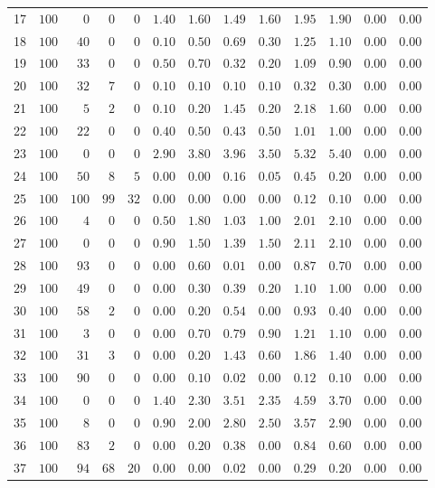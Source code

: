 \documentclass{article}
\begin{document}
\begin{landscape}
\begin{longtable}{lrrrrrrrrrrrr}
17&$100$&$  0$&$  0$&$  0$&$1.40$&$1.60$&$1.49$&$1.60$&$1.95$&$1.90$&$0.00$&$0.00$\\
18&$100$&$ 40$&$  0$&$  0$&$0.10$&$0.50$&$0.69$&$0.30$&$1.25$&$1.10$&$0.00$&$0.00$\\
19&$100$&$ 33$&$  0$&$  0$&$0.50$&$0.70$&$0.32$&$0.20$&$1.09$&$0.90$&$0.00$&$0.00$\\
20&$100$&$ 32$&$  7$&$  0$&$0.10$&$0.10$&$0.10$&$0.10$&$0.32$&$0.30$&$0.00$&$0.00$\\
21&$100$&$  5$&$  2$&$  0$&$0.10$&$0.20$&$1.45$&$0.20$&$2.18$&$1.60$&$0.00$&$0.00$\\
22&$100$&$ 22$&$  0$&$  0$&$0.40$&$0.50$&$0.43$&$0.50$&$1.01$&$1.00$&$0.00$&$0.00$\\
23&$100$&$  0$&$  0$&$  0$&$2.90$&$3.80$&$3.96$&$3.50$&$5.32$&$5.40$&$0.00$&$0.00$\\
24&$100$&$ 50$&$  8$&$  5$&$0.00$&$0.00$&$0.16$&$0.05$&$0.45$&$0.20$&$0.00$&$0.00$\\
25&$100$&$100$&$ 99$&$ 32$&$0.00$&$0.00$&$0.00$&$0.00$&$0.12$&$0.10$&$0.00$&$0.00$\\
26&$100$&$  4$&$  0$&$  0$&$0.50$&$1.80$&$1.03$&$1.00$&$2.01$&$2.10$&$0.00$&$0.00$\\
27&$100$&$  0$&$  0$&$  0$&$0.90$&$1.50$&$1.39$&$1.50$&$2.11$&$2.10$&$0.00$&$0.00$\\
28&$100$&$ 93$&$  0$&$  0$&$0.00$&$0.60$&$0.01$&$0.00$&$0.87$&$0.70$&$0.00$&$0.00$\\
29&$100$&$ 49$&$  0$&$  0$&$0.00$&$0.30$&$0.39$&$0.20$&$1.10$&$1.00$&$0.00$&$0.00$\\
30&$100$&$ 58$&$  2$&$  0$&$0.00$&$0.20$&$0.54$&$0.00$&$0.93$&$0.40$&$0.00$&$0.00$\\
31&$100$&$  3$&$  0$&$  0$&$0.00$&$0.70$&$0.79$&$0.90$&$1.21$&$1.10$&$0.00$&$0.00$\\
32&$100$&$ 31$&$  3$&$  0$&$0.00$&$0.20$&$1.43$&$0.60$&$1.86$&$1.40$&$0.00$&$0.00$\\
33&$100$&$ 90$&$  0$&$  0$&$0.00$&$0.10$&$0.02$&$0.00$&$0.12$&$0.10$&$0.00$&$0.00$\\
34&$100$&$  0$&$  0$&$  0$&$1.40$&$2.30$&$3.51$&$2.35$&$4.59$&$3.70$&$0.00$&$0.00$\\
35&$100$&$  8$&$  0$&$  0$&$0.90$&$2.00$&$2.80$&$2.50$&$3.57$&$2.90$&$0.00$&$0.00$\\
36&$100$&$ 83$&$  2$&$  0$&$0.00$&$0.20$&$0.38$&$0.00$&$0.84$&$0.60$&$0.00$&$0.00$\\
37&$100$&$ 94$&$ 68$&$ 20$&$0.00$&$0.00$&$0.02$&$0.00$&$0.29$&$0.20$&$0.00$&$0.00$\\

\end{longtable}
\end{landscape}
\end{document}

